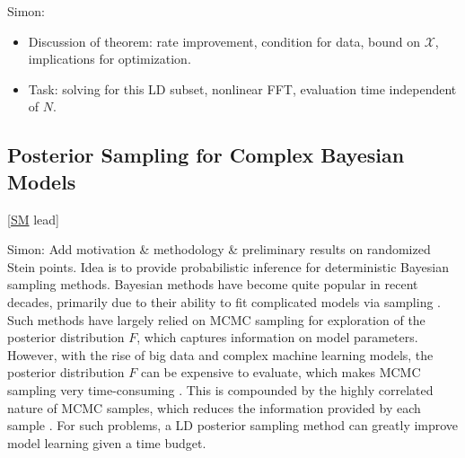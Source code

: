 \documentclass[11pt]{NSFamsart}
\newcommand{\SM}{\hyperlink{SMlink}{SM}\xspace}
\newcommand{\SMNote}[1]{{\color{blue}Simon: #1}}
\begin{document}
\SMNote{
\begin{itemize}
\item Discussion of theorem: rate improvement, condition for data, bound on $\mathcal{X}$, implications for optimization.
\item Task: solving for this LD subset, nonlinear FFT, evaluation time independent of $N$.
\end{itemize}
}

\subsection{Posterior Sampling for Complex Bayesian Models} [\SM lead]

\SMNote{Add motivation \& methodology \& preliminary results on randomized Stein points. Idea is to provide probabilistic inference for deterministic Bayesian sampling methods.} Bayesian methods have become quite popular in recent decades, primarily due to their ability to fit complicated models via sampling \cite{GelEtal13}. Such methods have largely relied on MCMC sampling for exploration of the posterior distribution $F$, which captures information on model parameters. However, with the rise of big data and complex machine learning models, the posterior distribution $F$ can be expensive to evaluate, which makes MCMC sampling very time-consuming \cite{joseph2015sequential}. This is compounded by the highly correlated nature of MCMC samples, which reduces the information provided by each sample \citep{link2012thinning}. For such problems, a LD posterior sampling method can greatly improve model learning given a time budget.

\end{document}

